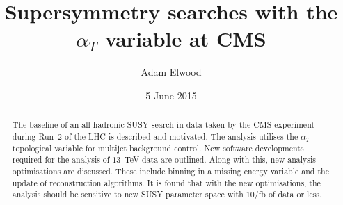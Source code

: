 

\title{Supersymmetry searches with the $\alpha_T$ variable at CMS}
\date{5 June 2015}
\author{Adam Elwood}

\maketitle        
        
\begin{abstract}
  \noindent
The baseline of an all hadronic SUSY search in data taken by the CMS experiment during Run~2 of the LHC is described and motivated. The analysis utilises the $\alpha_T$ topological variable for multijet background control. New software developments required for the analysis of $13$~TeV data are outlined. Along with this, new analysis optimisations are discussed. These include binning in a missing energy variable and the update of reconstruction algorithms. It is found that with the new optimisations, the analysis should be sensitive to new SUSY parameter space with $10/$fb of data or less.
\end{abstract}












